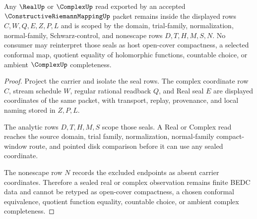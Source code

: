 \begin{theorem}
\label{thm:constructive-riemann-mapping-real-complex-seal-nonescape}
Any $\RealUp$ or $\ComplexUp$ read exported by an accepted $\ConstructiveRiemannMappingUp$ packet remains inside the displayed rows $C,W,Q,E,Z,P,L$ and is scoped by the domain, trial-family, normalization, normal-family, Schwarz-control, and nonescape rows $D,T,H,M,S,N$. No consumer may reinterpret those seals as host open-cover compactness, a selected conformal map, quotient equality of holomorphic functions, countable choice, or ambient $\ComplexUp$ completeness.
\end{theorem}
\begin{proof}
Project the carrier and isolate the seal rows. The complex coordinate row $C$, stream schedule $W$, regular rational readback $Q$, and Real seal $E$ are displayed coordinates of the same packet, with transport, replay, provenance, and local naming stored in $Z,P,L$.

The analytic rows $D,T,H,M,S$ scope those seals. A Real or Complex read reaches the source domain, trial family, normalization, normal-family compact-window route, and pointed disk comparison before it can use any sealed coordinate.

The nonescape row $N$ records the excluded endpoints as absent carrier coordinates. Therefore a sealed real or complex observation remains finite BEDC data and cannot be retyped as open-cover compactness, a chosen conformal equivalence, quotient function equality, countable choice, or ambient complex completeness.
\end{proof}



